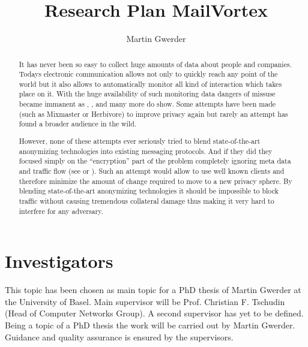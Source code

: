 \documentclass[twocolumn,a4paper,10pt,english]{scrartcl}
\begin{document}
\title{Research Plan MailVortex}
\author{Martin Gwerder}
\date{\SVNDate}

\maketitle

\begin{abstract}It has never been so easy to collect huge amounts of data about people and companies. Todays electronic communication allows not only to quickly reach any point of the world but it also allows to automatically monitor all kind of interaction which takes place on it. With the huge availability of such monitoring data dangers of missuse became immanent as \cite{ECHELON}, \cite{wiki:prism}, \cite{wiki:tempora} and many more do show. Some attempts have been made (such as Mixmaster\cite{mixmaster-spec} or Herbivore\cite{herbivore:tr}) to improve privacy again but rarely an attempt has found a broader audience in the wild. \par

However, none of these attempts ever seriously tried to blend state-of-the-art anonymizing technologies into existing messaging protocols. And if they did they focused simply on the ``encryption'' part of the problem completely ignoring meta data and traffic flow (see \cite{RFC3851} or \cite{RFC2015}). Such an attempt  would allow to use well known clients and therefore minimize the amount of change required to move to a new privacy sphere. By blending state-of-the-art anonymizing technologies it should be impossible to block traffic without causing tremendous collateral damage thus making it very hard to interfere for any adversary. 
\end{abstract}

\section{Investigators}
This topic has been chosen as main topic for a PhD thesis of Martin Gwerder at the University of Basel. Main supervisor will be Prof. Christian F. Tschudin (Head of Computer Networks Group). A second supervisor has yet to be defined. Being a topic of a PhD thesis the work will be carried out by Martin Gwerder. Guidance and quality assurance is ensured by the supervisors.
\end{document}
